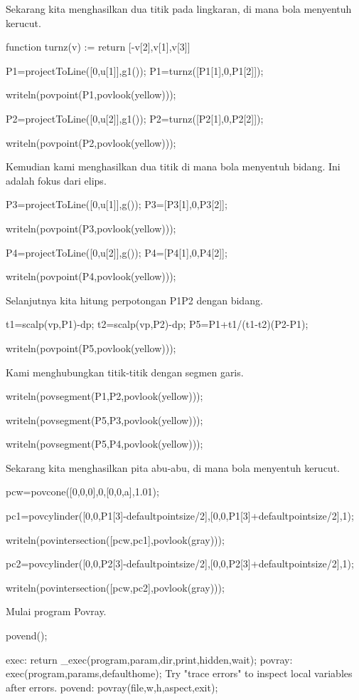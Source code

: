 \documentclass{article}
\begin{document}
Sekarang kita menghasilkan dua titik pada lingkaran, di mana bola
menyentuh kerucut.


\>function turnz(v) := return [-v[2],v[1],v[3]]

\>P1=projectToLine([0,u[1]],g1()); P1=turnz([P1[1],0,P1[2]]);

\>writeln(povpoint(P1,povlook(yellow)));

\>P2=projectToLine([0,u[2]],g1()); P2=turnz([P2[1],0,P2[2]]);

\>writeln(povpoint(P2,povlook(yellow)));


Kemudian kami menghasilkan dua titik di mana bola menyentuh bidang.
Ini adalah fokus dari elips.


\>P3=projectToLine([0,u[1]],g()); P3=[P3[1],0,P3[2]];

\>writeln(povpoint(P3,povlook(yellow)));

\>P4=projectToLine([0,u[2]],g()); P4=[P4[1],0,P4[2]];

\>writeln(povpoint(P4,povlook(yellow)));


Selanjutnya kita hitung perpotongan P1P2 dengan bidang.


\>t1=scalp(vp,P1)-dp; t2=scalp(vp,P2)-dp; P5=P1+t1/(t1-t2)\*(P2-P1);

\>writeln(povpoint(P5,povlook(yellow)));


Kami menghubungkan titik-titik dengan segmen garis.


\>writeln(povsegment(P1,P2,povlook(yellow)));

\>writeln(povsegment(P5,P3,povlook(yellow)));

\>writeln(povsegment(P5,P4,povlook(yellow)));


Sekarang kita menghasilkan pita abu-abu, di mana bola menyentuh
kerucut.


\>pcw=povcone([0,0,0],0,[0,0,a],1.01);

\>pc1=povcylinder([0,0,P1[3]-defaultpointsize/2],[0,0,P1[3]+defaultpointsize/2],1);

\>writeln(povintersection([pcw,pc1],povlook(gray)));

\>pc2=povcylinder([0,0,P2[3]-defaultpointsize/2],[0,0,P2[3]+defaultpointsize/2],1);

\>writeln(povintersection([pcw,pc2],povlook(gray)));


Mulai program Povray.


\>povend();


    exec:
        return _exec(program,param,dir,print,hidden,wait);
    povray:
        exec(program,params,defaulthome);
    Try "trace errors" to inspect local variables after errors.
    povend:
        povray(file,w,h,aspect,exit); 
\end{document}
